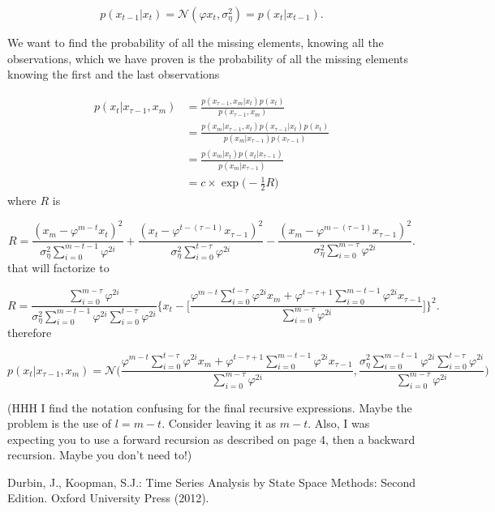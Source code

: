 \documentclass[11pt,a4paper]{article}
\begin{document}
{\[
    p(x_{t-1} | x_t) = \mathcal{N}(\varphi x_t, \sigma^2_\eta) = p(x_t | x_{t-1}).
\]

We want to find the probability of all the missing elements, knowing all the observations, which we have proven is the probability of all the missing elements knowing the first and the last observations

\begin{align*}
    p(x_t | x_{\tau-1}, x_m) &= \frac{p(x_{\tau-1}, x_m | x_t) p(x_t)}{p(x_{\tau-1}, x_m)} \\
    &= \frac{p(x_m | x_{\tau-1}, x_t) p(x_{\tau-1} | x_t) p(x_t)}{p(x_m | x_{\tau-1}) p(x_{\tau-1})}\\
    &= \frac{p(x_m | x_t) p(x_t | x_{\tau-1})}{p(x_m | x_{\tau-1})} \\
    &= c\times \exp\Big(-\frac{1}{2} R\Big)
\end{align*}
where $R$ is

\[
    R = \frac{(x_m - \varphi^{m-t} x_t)^2}{\sigma^2_\eta \sum_{i=0}^{m-t-1} \varphi^{2i}} + \frac{(x_t - \varphi^{t-(\tau-1)} x_{\tau-1})^2}{\sigma^2_\eta \sum_{i=0}^{t-\tau} \varphi^{2i}} - \frac{(x_m - \varphi^{m -(\tau-1)} x_{\tau-1})^2}{\sigma^2_\eta \sum_{i=0}^{m-\tau} \varphi^{2i}}.
\]
that will factorize to

\[
    R = \frac{\sum_{i=0}^{m-\tau} \varphi^{2i}}{\sigma^2_\eta \sum_{i=0}^{m-t-1} \varphi^{2i} \sum_{i=0}^{t-\tau} \varphi^{2i}} \Bigg\{ x_t - \Bigg[\frac{\varphi^{m-t} \sum_{i=0}^{t-\tau} \varphi^{2i} x_{m} + \varphi^{t-\tau+1} \sum_{i=0}^{m-t-1} \varphi^{2i} x_{\tau-1}}{\sum_{i=0}^{m-\tau} \varphi^{2i}}\Bigg] \Bigg\}^2.
\]
therefore

\[
    p(x_t | x_{\tau-1}, x_{m}) = \mathcal{N} \Bigg(\frac{\varphi^{m-t} \sum_{i=0}^{t-\tau} \varphi^{2i} x_{m} + \varphi^{t-\tau+1} \sum_{i=0}^{m-t-1} \varphi^{2i} x_{\tau-1}}{\sum_{i=0}^{m-\tau} \varphi^{2i}}, \frac{\sigma^2_\eta \sum_{i=0}^{m-t-1} \varphi^{2i} \sum_{i=0}^{t-\tau} \varphi^{2i}}{\sum_{i=0}^{m-\tau} \varphi^{2i}} \Bigg)
\]

}

{\color{red} (HHH I find the notation confusing for the final recursive expressions. Maybe the problem is the use of $l = m - t$. Consider leaving it as $m - t$. Also, I was expecting you to use a forward recursion as described on page 4, then a backward recursion. Maybe you don't need to!)}

\begin{thebibliography}{}

Durbin, J., Koopman, S.J.: Time Series Analysis by State Space Methods: Second Edition. Oxford University Press (2012). 

\end{thebibliography}
\end{document}
